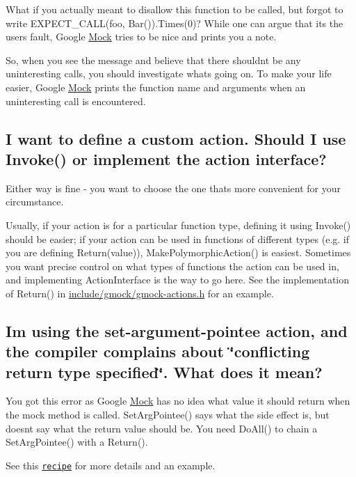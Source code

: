 What if you actually meant to disallow this function to be called, but forgot to write {\ttfamily E\+X\+P\+E\+C\+T\+\_\+\+C\+A\+L\+L(foo, Bar()).Times(0)}? While one can argue that it\textquotesingle{}s the user\textquotesingle{}s fault, Google \hyperlink{class_mock}{Mock} tries to be nice and prints you a note.

So, when you see the message and believe that there shouldn\textquotesingle{}t be any uninteresting calls, you should investigate what\textquotesingle{}s going on. To make your life easier, Google \hyperlink{class_mock}{Mock} prints the function name and arguments when an uninteresting call is encountered.

\subsection*{I want to define a custom action. Should I use Invoke() or implement the action interface?}

Either way is fine -\/ you want to choose the one that\textquotesingle{}s more convenient for your circumstance.

Usually, if your action is for a particular function type, defining it using {\ttfamily Invoke()} should be easier; if your action can be used in functions of different types (e.\+g. if you are defining {\ttfamily Return(value)}), {\ttfamily Make\+Polymorphic\+Action()} is easiest. Sometimes you want precise control on what types of functions the action can be used in, and implementing {\ttfamily Action\+Interface} is the way to go here. See the implementation of {\ttfamily Return()} in {\ttfamily \hyperlink{gmock-actions_8h_source}{include/gmock/gmock-\/actions.\+h}} for an example.

\subsection*{I\textquotesingle{}m using the set-\/argument-\/pointee action, and the compiler complains about \char`\"{}conflicting return type specified\char`\"{}. What does it mean?}

You got this error as Google \hyperlink{class_mock}{Mock} has no idea what value it should return when the mock method is called. {\ttfamily Set\+Arg\+Pointee()} says what the side effect is, but doesn\textquotesingle{}t say what the return value should be. You need {\ttfamily Do\+All()} to chain a {\ttfamily Set\+Arg\+Pointee()} with a {\ttfamily Return()}.

See this \href{http://code.google.com/p/googlemock/wiki/V1_6_CookBook#Mocking_Side_Effects}{\tt recipe} for more details and an example.

